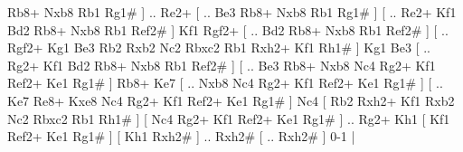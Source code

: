 Rb8+ Nxb8  Rb1 Rg1#   ] .. Re2+ [ .. Be3  Rb8+ Nxb8  Rb1 Rg1#   ]  [ .. Re2+  Kf1 Bd2  Rb8+ Nxb8  Rb1 Ref2#   ]  Kf1   Rgf2+ [ .. Bd2  Rb8+ Nxb8  Rb1 Ref2#   ]  [ .. Rgf2+  Kg1 Be3  Rb2 Rxb2  Nc2 Rbxc2  Rb1 Rxh2+  Kf1 Rh1#   ]  Kg1  Be3 [ .. Rg2+  Kf1 Bd2  Rb8+ Nxb8  Rb1 Ref2#   ]  [ .. Be3  Rb8+ Nxb8  Nc4 Rg2+  Kf1 Ref2+  Ke1 Rg1#   ]  Rb8+   Ke7 [ .. Nxb8  Nc4 Rg2+  Kf1 Ref2+  Ke1 Rg1#   ]  [ .. Ke7  Re8+ Kxe8  Nc4 Rg2+  Kf1 Ref2+  Ke1 Rg1#   ]  Nc4 [  Rb2 Rxh2+  Kf1 Rxb2  Nc2 Rbxc2  Rb1 Rh1#   ]  [  Nc4 Rg2+  Kf1 Ref2+  Ke1 Rg1#   ] .. Rg2+    Kh1 [  Kf1 Ref2+  Ke1 Rg1#   ]  [  Kh1 Rxh2#   ] .. Rxh2#    [ .. Rxh2#   ] 0-1  |
